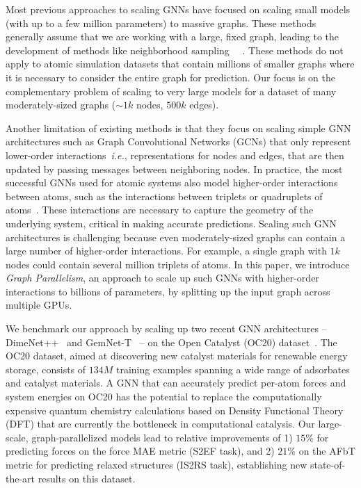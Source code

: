 \documentclass{article} \usepackage{iclr2022_conference,times}
\begin{document}
Most previous approaches to scaling GNNs have focused on scaling small models (with up to a few million parameters) to massive graphs. These methods generally assume that we are working with a large, fixed graph, leading to the development of methods like neighborhood sampling~\citep{jangda2021accelerating,zheng2021distdgl}
~\citep{Jia2020ImprovingTA,Ma2019NeuGraphPD,tripathy2020reducing}.
These methods do not apply to atomic simulation datasets that contain millions of smaller graphs
where it is necessary to consider the entire graph for prediction. Our focus is on the complementary problem of scaling to very large models for a dataset of many moderately-sized graphs ($\sim1k$ nodes, $500k$ edges).

Another limitation of existing methods is that they focus on scaling simple GNN architectures such as Graph Convolutional Networks (GCNs) that only represent lower-order interactions~\textit{i.e.}, representations for nodes and edges, that are then updated by passing messages between neighboring nodes.
In practice, the most successful GNNs used for atomic systems also model higher-order interactions between atoms, such as the interactions between triplets or quadruplets of atoms~\citep{klicpera_dimenetpp_2020,klicpera2021gemnet,liu2021spherical}.
These interactions are necessary to capture the geometry of the underlying system,
critical in making accurate predictions. Scaling such GNN architectures is challenging because even moderately-sized graphs can contain a large number of higher-order interactions. For example, a single graph with $1k$ nodes could contain several million triplets of atoms.
In this paper, we introduce \emph{Graph Parallelism}, an approach to scale up
such GNNs with higher-order interactions to billions of parameters,
by splitting up the input graph across multiple GPUs.


We benchmark our approach by scaling up two recent GNN architectures -- DimeNet++~\citep{klicpera_dimenetpp_2020} and GemNet-T~\citep{klicpera2021gemnet} -- on the Open Catalyst (OC20) dataset~\citep{OC20}.
The OC20 dataset, aimed at discovering new catalyst materials for renewable energy storage,
consists of $134M$ training examples spanning a wide range of adsorbates and catalyst materials.
A GNN that can accurately predict per-atom forces and system energies on OC20
has the potential to replace the computationally expensive quantum chemistry calculations based on Density Functional Theory (DFT) that are currently the bottleneck in computational catalysis. Our large-scale, graph-parallelized models lead to relative improvements of
1) $15\%$ for predicting forces on the force MAE metric (S2EF task), and 2) $21\%$ on the AFbT metric for predicting relaxed structures (IS2RS task), establishing new state-of-the-art results on this dataset.
\end{document}
